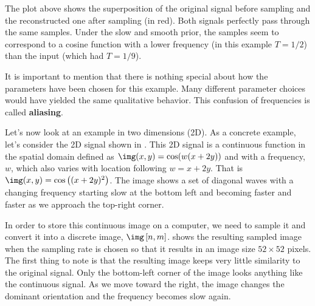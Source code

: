 The plot above shows the superposition of the original signal before sampling and the reconstructed one after sampling (in red). Both signals perfectly pass through the same samples. Under the slow and smooth prior, the samples seem to correspond to a cosine function with a lower frequency (in this example $T=1/2$) than the input (which had $T=1/9$). 


It is important to mention that there is nothing special about how the parameters have been chosen for this example. Many different parameter choices would have yielded the same qualitative behavior. This confusion of frequencies is called {\bf aliasing}. 

Let's now look at an example in two dimensions (2D). As a concrete example, let's consider the 2D signal shown in . This 2D signal is a continuous function in the spatial domain defined as $\img (x,y) = \cos (w (x+2y))$ and with a frequency, $w$, which also varies with location following $w = x+2y$. That is $\img (x,y) = \cos \left( (x+2y)^2 \right)$. The image shows a set of diagonal waves with a changing frequency starting slow at the bottom left and becoming faster and faster as we approach the top-right corner. 


In order to store this continuous image on a computer, we need to sample it and convert it into a discrete image, $\img \left[ n,m \right]$.  shows the resulting sampled image when the sampling rate is chosen so that it results in an image size $52 \times 52$ pixels. The first thing to note is that the resulting image keeps very little similarity to the original signal. Only the bottom-left corner of the image looks anything like the continuous signal. As we move toward the right, the image changes the dominant orientation and the frequency becomes slow again. 


